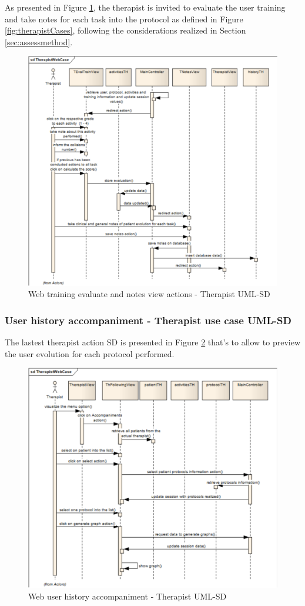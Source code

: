 As presented in Figure \ref{fig:UMLSD-TherapistWebCase05}, the therapist is invited to evaluate the user training and take notes for each task into the protocol as defined in Figure \ref{fig:therapistCases}, following the considerations realized in Section \ref{sec:assessmethod}.  

\begin{figure}[!hbt]
\begin{center}
\includegraphics[width=0.7 \textwidth]{img/cap4/UMLSD-TherapistWebCase05}
\caption{Web training evaluate and notes view actions - Therapist UML-SD}
\label{fig:UMLSD-TherapistWebCase05}
\end{center}
\vspace{-20pt}
\end{figure} 

\subsubsection{User history accompaniment - Therapist  use case UML-SD}

The lastest therapist action SD is presented in Figure \ref{fig:UMLSD-TherapistWebCase06} that's to allow to preview the user evolution for each protocol performed.
 
\begin{figure}[!hbt]
\begin{center}
\includegraphics[width=0.7 \textwidth]{img/cap4/UMLSD-TherapistWebCase06}
\caption{Web user history accompaniment - Therapist UML-SD}
\label{fig:UMLSD-TherapistWebCase06}
\end{center}
\vspace{-20pt}
\end{figure} 

